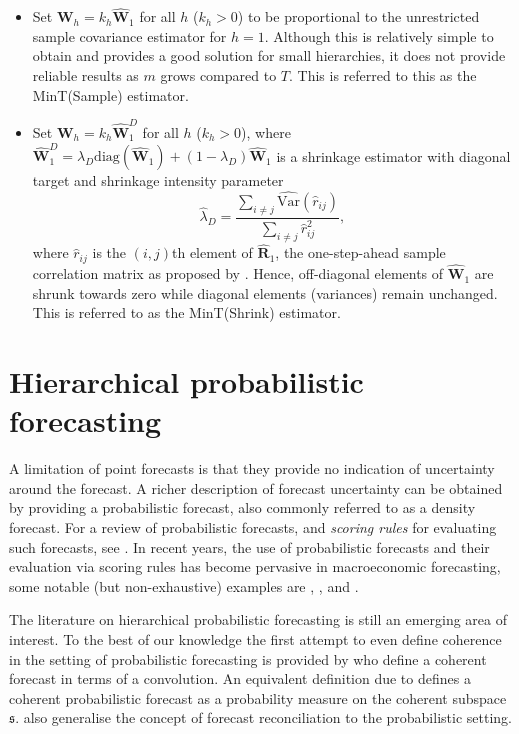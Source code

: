 \documentclass[graybox]{svmult}
\begin{document}
\begin{itemize}
	\item Set $\bm{W}_{h}=k_{h}\hat{\bm{W}}_{1}$ for all $h$ ($k_{h} > 0$) to be proportional to the unrestricted sample covariance estimator for $h=1$. Although this is relatively simple to obtain and provides a good solution for small hierarchies, it does not provide reliable results as $m$ grows compared to $T$. This is referred to this as the MinT(Sample) estimator.

	\item Set $\bm{W}_{h}=k_{h}\hat{\bm{W}}_{1}^D$ for all $h$ ($k_{h} > 0$), where $\hat{\bm{W}}^{D}_{1} = \lambda_{D} \text{diag}(\hat{\bm{W}}_{1}) + (1 - \lambda_{D})\hat{\bm{W}}_{1}$ is a shrinkage estimator with diagonal target and shrinkage intensity parameter
  $$
    \hat{\lambda}_{D} = \frac{\sum_{i \ne j}\hat{\text{Var}}(\hat{r}_{ij})}{\sum_{i \ne j}\hat{r}_{ij}^2},
  $$
	where $\hat{r}_{ij}$ is the $(i,j)$th element of $\hat{\bm{R}}_{1}$, the one-step-ahead sample correlation matrix as proposed by \citet{Schafer2005}. Hence, off-diagonal elements of $\hat{\bm{W}}_1$ are shrunk towards zero while diagonal elements (variances) remain unchanged. This is referred to as the MinT(Shrink) estimator.
\end{itemize}

\section{Hierarchical probabilistic forecasting}\label{sec:probforecasting}

A limitation of point forecasts is that they provide no indication of uncertainty around the forecast. A richer description of forecast uncertainty can be obtained by providing a probabilistic forecast, also commonly referred to as a density forecast. For a review of probabilistic forecasts, and \emph{scoring rules} for evaluating such forecasts, see \citep{Gneiting2014}. In recent years, the use of probabilistic forecasts and their evaluation via scoring rules has become pervasive in macroeconomic forecasting, some notable (but non-exhaustive) examples are \citet{GewAmi2010}, \citet{BilEtAl2013}, \citet{CarEtAl2015} and \citet{ClaRav2015}.

The literature on hierarchical probabilistic forecasting is still an emerging area of interest.  To the best of our knowledge the first attempt to even define coherence in the setting of probabilistic forecasting is provided by \citet{Taieb2017} who define a coherent forecast in terms of a convolution. An equivalent definition due to \citet{GamEtAl2018} defines a coherent probabilistic forecast as a probability measure on the coherent subspace $\mathfrak{s}$. \citet{GamEtAl2018} also generalise the concept of forecast reconciliation to the probabilistic setting.
\end{document}

